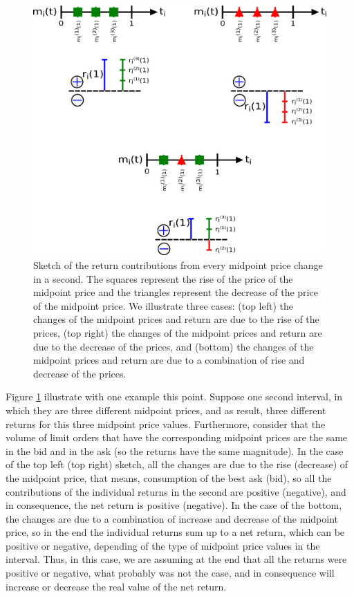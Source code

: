 \begin{figure}[htbp]
    \centering
    \includegraphics[width=\columnwidth]{figures/02_return_contributions.png}
    \caption{Sketch of the return contributions from every midpoint price
             change in a second. The squares represent the rise of the price of
             the midpoint price and the triangles represent the decrease of the
             price of the midpoint price. We illustrate three cases: (top left)
             the changes of the midpoint prices and return are due to the rise
             of the prices, (top right) the changes of the midpoint prices and
             return are due to the decrease of the prices, and (bottom) the
             changes of the midpoint prices and return are due to a combination
             of rise and decrease of the prices.}
    \label{fig:return_contributions}
\end{figure}

Figure \ref{fig:return_contributions} illustrate with one example this point.
Suppose one second interval, in which they are three different midpoint prices,
and as result, three different returns for this three midpoint price
values. Furthermore, consider that the volume of limit orders that have the
corresponding midpoint prices are the same in the bid and in the ask (so the
returns have the same magnitude). In the case of the top left (top right)
sketch, all the changes are due to the rise (decrease) of the midpoint price,
that means, consumption of the best ask (bid), so all the contributions of the
individual returns in the second are positive (negative), and in consequence,
the net return is positive (negative). In the case of the bottom, the changes
are due to a combination of increase and decrease of the midpoint price, so in
the end the individual returns sum up to a net return, which can be positive or
negative, depending of the type of midpoint price values in the interval. Thus,
in this case, we are assuming at the end that all the returns were positive or
negative, what probably was not the case, and in consequence will increase or
decrease the real value of the net return.

